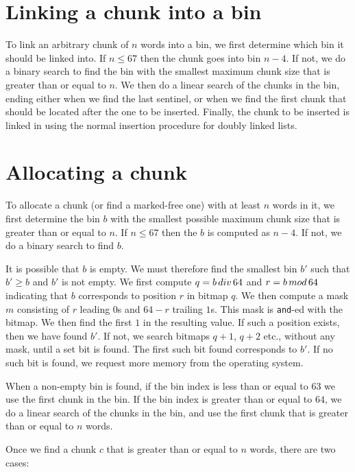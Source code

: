 \section{Linking a chunk into a bin}

To link an arbitrary chunk of $n$ words into a bin, we first determine
which bin it should be linked into.  If $n \le 67$ then the chunk goes
into bin $n-4$.  If not, we do a binary search to find the bin with
the smallest maximum chunk size that is greater than or equal to $n$.
We then do a linear search of the chunks in the bin, ending either
when we find the last sentinel, or when we find the first chunk that
should be located after the one to be inserted.  Finally, the chunk to
be inserted is linked in using the normal insertion procedure for
doubly linked lists.

\section{Allocating a chunk}

To allocate a chunk (or find a marked-free one)
with at least $n$ words in it, we first determine
the bin $b$ with the smallest possible maximum chunk size that is
greater than or equal to $n$.  If $n \le 67$ then the $b$ is computed
as $n-4$.  If not, we do a binary search to find $b$.

It is possible that $b$ is empty.  We must therefore find the smallest
bin $b'$ such that $b' \ge b$ and $b'$ is not empty.  We first compute
$q = b \thinspace div \thinspace 64$ and $r = b \thinspace
mod \thinspace 64$ indicating that $b$ corresponds to position $r$ in
bitmap $q$.  We then compute a mask $m$ consisting of $r$ leading $0$s
and $64-r$ trailing $1$s.  This mask is \texttt{and}-ed with the bitmap.  We
then find the first $1$ in the resulting value.  If such a position
exists, then we have found $b'$.  If not, we search bitmaps $q+1$,
$q+2$ etc., without any mask, until a set bit is found.  The first
such bit found corresponds to $b'$.  If no such bit is found, we
request more memory from the operating system.

When a non-empty bin is found, if the bin index is less than or equal
to $63$ we use the first chunk in the bin.  If the bin index is
greater than or equal to $64$, we do a linear search of the chunks in
the bin, and use the first chunk that is greater than or equal to $n$
words.

Once we find a chunk $c$ that is greater than or equal to $n$ words,
there are two cases:


